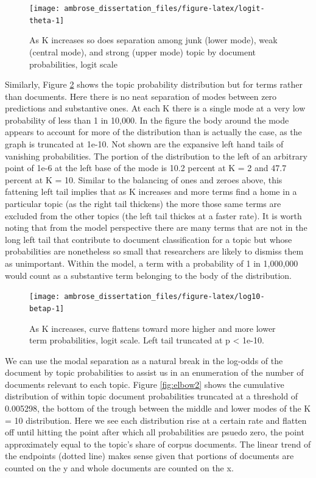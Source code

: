 \documentclass[]{book}
\theoremstyle{definition}
\theoremstyle{definition}
\theoremstyle{definition}
\theoremstyle{remark}
\begin{document}
\begin{figure}

{\centering \texttt{[image: ambrose\_dissertation\_files/figure-latex/logit-theta-1]} 

}

\caption{As K increases so does separation among junk (lower mode), weak (central mode), and strong (upper mode) topic by document probabilities, logit scale}\label{fig:logit-theta}
\end{figure}

Similarly, Figure \ref{fig:log10-betap} shows the topic probability
distribution but for terms rather than documents. Here there is no neat
separation of modes between zero predictions and substantive ones. At
each K there is a single mode at a very low probability of less than 1
in 10,000. In the figure the body around the mode appears to account for
more of the distribution than is actually the case, as the graph is
truncated at 1e-10. Not shown are the expansive left hand tails of
vanishing probabilities. The portion of the distribution to the left of
an arbitrary point of 1e-6 at the left base of the mode is 10.2 percent
at K = 2 and 47.7 percent at K = 10. Similar to the balancing of ones
and zeroes above, this fattening left tail implies that as K increases
and more terms find a home in a particular topic (as the right tail
thickens) the more those same terms are excluded from the other topics
(the left tail thickes at a faster rate). It is worth noting that from
the model perspective there are many terms that are not in the long left
tail that contribute to document classification for a topic but whose
probabilities are nonetheless so small that researchers are likely to
dismiss them as unimportant. Within the model, a term with a probability
of 1 in 1,000,000 would count as a substantive term belonging to the
body of the distribution.

\begin{figure}

{\centering \texttt{[image: ambrose\_dissertation\_files/figure-latex/log10-betap-1]} 

}

\caption{As K increases, curve flattens toward more higher and more lower term probabilities, logit scale. Left tail truncated at p < 1e-10.}\label{fig:log10-betap}
\end{figure}

We can use the modal separation as a natural break in the log-odds of
the document by topic probabilities to assist us in an enumeration of
the number of documents relevant to each topic. Figure \ref{fig:elbow2}
shows the cumulative distribution of within topic document probabilities
truncated at a threshold of 0.005298, the bottom of the trough between
the middle and lower modes of the K = 10 distribution. Here we see each
distribution rise at a certain rate and flatten off until hitting the
point after which all probabilities are psuedo zero, the point
approximately equal to the topic's share of corpus documents. The linear
trend of the endpoints (dotted line) makes sense given that portions of
documents are counted on the y and whole documents are counted on the x.
\end{document}
